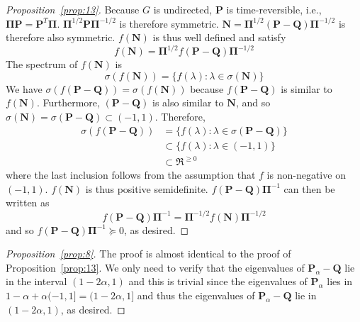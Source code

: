 \documentclass[10pt,twocolumn]{article}
\numberwithin{equation}{section}
\begin{document}
\begin{proof}[Proposition~\ref{prop:13}]
  Because $G$ is undirected, $\mathbf{P}$ is time-reversible,
  i.e., $\bm{\Pi}\mathbf{P} =
  \mathbf{P}^{T}\bm{\Pi}$. $\bm{\Pi}^{1/2}\mathbf{P}\bm{\Pi}^{-1/2}$
  is therefore symmetric. $\mathbf{N} =
  \bm{\Pi}^{1/2}(\mathbf{P} - \mathbf{Q})\bm{\Pi}^{-1/2}$ is
  therefore also symmetric. $f(\mathbf{N})$ is thus well defined and
  satisfy
  \begin{equation}
    \label{eq:66}
    f(\mathbf{N}) = \bm{\Pi}^{1/2}f(\mathbf{P} - \mathbf{Q})\bm{\Pi}^{-1/2}
  \end{equation}
  The spectrum of $f(\mathbf{N})$ is
  \begin{equation}
    \label{eq:67}
    \sigma(f(\mathbf{N})) = \{ f(\lambda) \colon \lambda \in
    \sigma(\mathbf{N}) \}
  \end{equation}
  We have $\sigma(f(\mathbf{P} - \mathbf{Q})) = \sigma(f(\mathbf{N}))$
  because $f(\mathbf{P} - \mathbf{Q})$ is similar to
  $f(\mathbf{N})$. Furthermore, $(\mathbf{P} - \mathbf{Q})$ is also
  similar to $\mathbf{N}$, and so $\sigma(\mathbf{N}) =
  \sigma(\mathbf{P} - \mathbf{Q}) \subset (-1,1)$. Therefore,
  \begin{equation}
    \label{eq:68}
    \begin{split}
    \sigma(f(\mathbf{P} - \mathbf{Q})) &= \{ f(\lambda) \colon \lambda \in
    \sigma(\mathbf{P} - \mathbf{Q})\} \\ &\subset \{ f(\lambda) \colon
    \lambda \in (-1,1) \} \\
    &\subset \Re^{\geq 0}
    \end{split}
  \end{equation}
  where the last inclusion follows from the assumption that $f$ is
  non-negative on $(-1,1)$. $f(\mathbf{N})$ is thus positive
  semidefinite. $f(\mathbf{P} - \mathbf{Q})\bm{\Pi}^{-1}$ can then be
  written as
  \begin{equation}
    \label{eq:69}
f(\mathbf{P} - \mathbf{Q})\bm{\Pi}^{-1} = \bm{\Pi}^{-1/2}
f(\mathbf{N}) \bm{\Pi}^{-1/2}
  \end{equation}
and so $f(\mathbf{P} - \mathbf{Q})\bm{\Pi}^{-1} \succeq
0$, as desired. 
\end{proof}
\begin{proof}[Proposition~\ref{prop:8}]
  The proof is almost identical to the proof of Proposition~\ref{prop:13}. We
  only need to verify that the eigenvalues of $\mathbf{P}_{\alpha} - \mathbf{Q}$
  lie in the interval $(1 - 2\alpha, 1)$ and this is trivial since
  the eigenvalues of $\mathbf{P}_{\alpha}$ lies in $1 - \alpha +
  \alpha(-1,1] = (1 - 2\alpha, 1]$ and thus the eigenvalues of
  $\mathbf{P}_{\alpha} - \mathbf{Q}$ lie in $(1 - 2\alpha, 1)$, as desired.
\end{proof}
\end{document}
